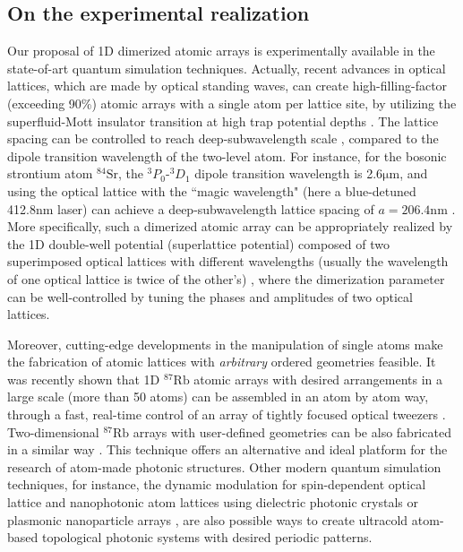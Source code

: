 \documentclass[aps,pra,reprint,groupedaddress,nofootinbib,longbibliography,showpacs]{revtex4-1}
\begin{document}
\subsection{On the experimental realization}
Our proposal of 1D dimerized atomic arrays is experimentally available in the state-of-art quantum simulation techniques.  Actually, recent advances in optical lattices, which are made by optical standing waves, can create high-filling-factor (exceeding 90\%) atomic arrays with a single atom per lattice site, by utilizing the superfluid-Mott insulator transition at high trap potential depths \cite{shersonNature2010,bakrNature2011,bakrScience2010,weitenbergNature2011}. The lattice spacing can be controlled to reach deep-subwavelength scale \cite{syzranovNaturecomms2016,olmosPRL2013,wangPRL2018}, compared to the dipole transition wavelength of the two-level atom. For instance, for the bosonic strontium atom $\mathrm{^{84}Sr}$, the $^3P_0$-$^3D_1$ dipole transition wavelength is 2.6$\mathrm{\mu m}$, and using the optical lattice with the ``magic wavelength" (here a blue-detuned 412.8nm laser) can achieve a deep-subwavelength lattice spacing of $a=206.4\mathrm{nm}$ \cite{olmosPRL2013}. More specifically, such a dimerized atomic array can be appropriately realized by the 1D double-well potential (superlattice potential) composed of two superimposed optical lattices with different wavelengths (usually the wavelength of one optical lattice is twice of the other's) \cite{follingNaturephys2007,wirthNaturephys2011,atalaNaturephys2013}, where the dimerization parameter can be well-controlled by tuning the phases and amplitudes of two optical lattices.

Moreover, cutting-edge developments in the manipulation of single atoms make the fabrication of atomic lattices with \textit{arbitrary} ordered geometries feasible. It was recently shown that 1D $\mathrm{^{87}Rb}$ atomic arrays with desired arrangements in a large scale (more than 50 atoms) can be assembled in an atom by atom way, through a fast, real-time control of an array of tightly focused optical tweezers \cite{endresScience2016,bernienNature2017}. Two-dimensional $\mathrm{^{87}Rb}$ arrays with user-defined geometries can be also fabricated in a similar way \cite{lahayeScience2016}. This technique offers an alternative and ideal platform for the research of atom-made photonic structures. Other modern quantum simulation techniques, for instance, the dynamic modulation for spin-dependent optical lattice \cite{nascimbenePRL2015} and nanophotonic atom lattices using dielectric photonic crystals \cite{gonzalezNaturephoton2015} or plasmonic nanoparticle arrays \cite{gullansPRL2012}, are also possible ways to create ultracold atom-based topological photonic systems with desired periodic patterns.
\end{document}
